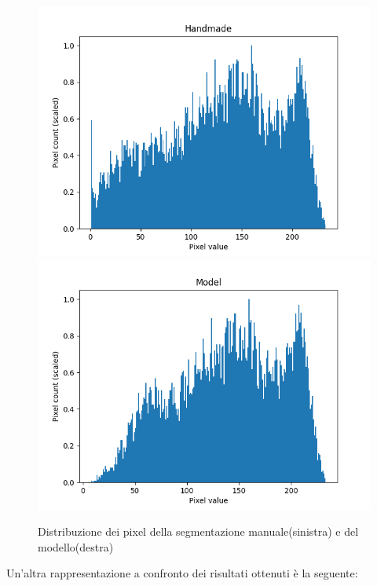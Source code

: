 \begin{figure}[!ht]
	\begin{adjustbox}{width=0.9\columnwidth, center}
    \includegraphics{./images/handmade_scaled_hist.png}
    \hspace{20pt} %
    \includegraphics{./images/model_scaled_hist.png}
  \end{adjustbox}
  \caption{Distribuzione dei pixel della segmentazione manuale(sinistra) e del modello(destra)}
  \label{fig:distribuzione dei pixel della segmentazione manuale e del modello}
\end{figure}

Un'altra rappresentazione a confronto dei risultati ottenuti \`e la seguente:

